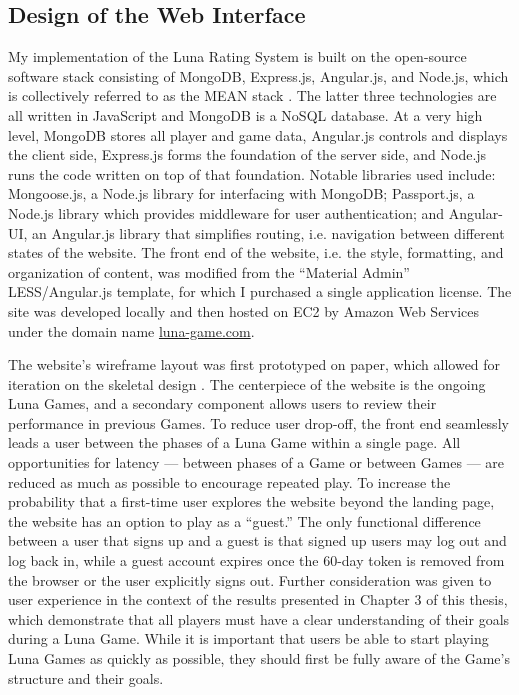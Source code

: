 \subsection{Design of the Web Interface}

My implementation of the Luna Rating System is built on the open-source software stack consisting of MongoDB, Express.js, Angular.js, and Node.js, which is collectively referred to as the MEAN stack \citep{karpov2013mean}. The latter three technologies are all written in JavaScript and MongoDB is a NoSQL database. At a very high level, MongoDB stores all player and game data, Angular.js controls and displays the client side, Express.js forms the foundation of the server side, and Node.js runs the code written on top of that foundation. Notable libraries used include: Mongoose.js, a Node.js library for interfacing with MongoDB; Passport.js, a Node.js library which provides middleware for user authentication; and Angular-UI, an Angular.js library that simplifies routing, i.e. navigation between different states of the website. The front end of the website, i.e. the style, formatting, and organization of content, was modified from the ``Material Admin'' LESS/Angular.js template, for which I purchased a single application license. The site was developed locally and then hosted on EC2 by Amazon Web Services under the domain name \url{luna-game.com}.

The website's wireframe layout was first prototyped on paper, which allowed for iteration on the skeletal design \citep{rettig1994prototyping}. The centerpiece of the website is the ongoing Luna Games, and a secondary component allows users to review their performance in previous Games. To reduce user drop-off, the front end seamlessly leads a user between the phases of a Luna Game within a single page. All opportunities for latency --- between phases of a Game or between Games ---  are reduced as much as possible to encourage repeated play. To increase the probability that a first-time user explores the website beyond the landing page, the website has an option to play as a ``guest.'' The only functional difference between a user that signs up and a guest is that signed up users may log out and log back in, while a guest account expires once the $60$-day token is removed from the browser or the user explicitly signs out. Further consideration was given to user experience in the context of the results presented in Chapter $3$ of this thesis, which demonstrate that all players must have a clear understanding of their goals during a Luna Game. While it is important that users be able to start playing Luna Games as quickly as possible, they should first be fully aware of the Game's structure and their goals.

